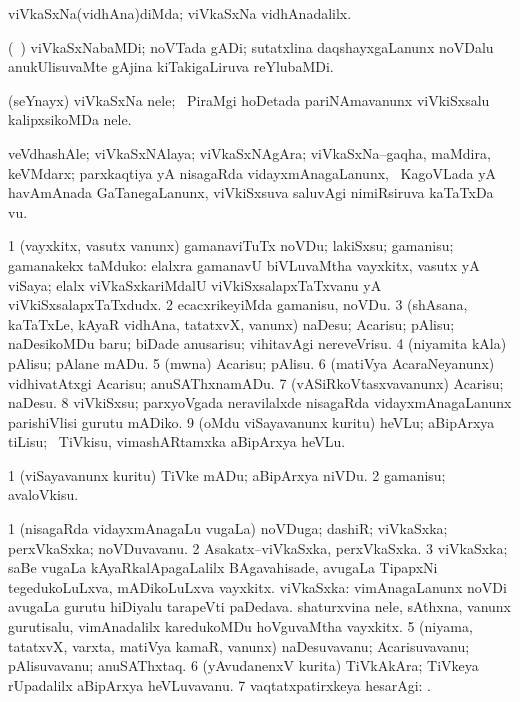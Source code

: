 \bentry
{}
\gl{\kirxvi}
\bmng
 viVkaSxNa(vidhAna)diMda; viVkaSxNa vidhAnadalilx. 
\emng
\eentry

\bentry
{}
\gl{\nA}
\bmng
(\kanmu\ \ame) viVkaSxNabaMDi; noVTada gADi; sutatxlina daqshayxgaLanunx noVDalu anukUlisuvaMte gAjina kiTakigaLiruva reYlubaMDi. 
\emng
\eentry

\bentry
{}
\gl{\nA}
\bmng
(seYnayx) viVkaSxNa nele; \kanmu\ PiraMgi hoDetada pariNAmavanunx viVkiSxsalu kalipxsikoMDa nele. 
\emng
\eentry

\bentry
{}
\gl{\nA}
\bmng
veVdhashAle; viVkaSxNAlaya; viVkaSxNAgAra; viVkaSxNa--gaqha, maMdira, keVMdarx; parxkaqtiya yA nisagaRda vidayxmAnagaLanunx, \kanmu\ KagoVLada yA havAmAnada GaTanegaLanunx, viVkiSxsuva saluvAgi nimiRsiruva kaTaTxDa \mo vu. 
\emng
\eentry

\bentry
{}
\gl{\sakirx}
\bmng
\bnum
\num{1} (vayxkitx, vasutx \mo vanunx) gamanaviTuTx noVDu; lakiSxsu; gamanisu; gamanakekx taMduko:  elalxra gamanavU biVLuvaMtha vayxkitx, vasutx yA viSaya; elalx viVkaSxkariMdalU viVkiSxsalapxTaTxvanu yA viVkiSxsalapxTaTxdudx. 
\num{2} ecacxrikeyiMda gamanisu, noVDu. 
\num{3} (shAsana, kaTaTxLe, kAyaR vidhAna, tatatxvX, \mo vanunx) naDesu; Acarisu; pAlisu; naDesikoMDu baru; biDade anusarisu; vihitavAgi nereveVrisu. 
\num{4} (niyamita kAla) pAlisu; pAlane mADu. 
\num{5} (mwna) Acarisu; pAlisu. 
\num{6} (matiVya AcaraNeyanunx) vidhivatAtxgi Acarisu; anuSAThxnamADu. 
\num{7} (vASiRkoVtasxvavanunx) Acarisu; naDesu. 
\num{8} viVkiSxsu; parxyoVgada neravilalxde nisagaRda vidayxmAnagaLanunx parishiVlisi gurutu mADiko. 
\num{9} (oMdu viSayavanunx kuritu) heVLu; aBipArxya tiLisu; \kanmu\ TiVkisu, vimashARtamxka aBipArxya heVLu. 
\enum
\emng

\noindent
\gl{\akirx}
\bmng
\bnum
\num{1} (viSayavanunx kuritu) TiVke mADu; aBipArxya niVDu. 
\num{2} gamanisu; avaloVkisu. 
\enum
\emng
\eentry

\bentry
{}
\gl{\nA}
\bmng
\bnum
\num{1} (nisagaRda vidayxmAnagaLu \mo vugaLa) noVDuga; dashiR; viVkaSxka; perxVkaSxka; noVDuvavanu. 
\num{2} Asakatx--viVkaSxka, perxVkaSxka. 
\num{3} viVkaSxka; saBe \mo vugaLa kAyaRkalApagaLalilx BAgavahisade, avugaLa TipapxNi tegedukoLuLxva, mADikoLuLxva vayxkitx. 
 viVkaSxka: 
\banum
{} vimAnagaLanunx noVDi avugaLa gurutu hiDiyalu tarapeVti paDedava. 
 shaturxvina nele, sAthxna, \mo vanunx gurutisalu, vimAnadalilx karedukoMDu hoVguvaMtha vayxkitx. 
\eanum
\numie
\num{5} (niyama, tatatxvX, varxta, matiVya kamaR, \mo vanunx) naDesuvavanu; Acarisuvavanu; pAlisuvavanu; anuSAThxtaq. 
\num{6} (yAvudanenxV kurita) TiVkAkAra; TiVkeya rUpadalilx aBipArxya heVLuvavanu. 
\num{7} vaqtatxpatirxkeya hesarAgi: . 
\enum
\emng
\eentry

